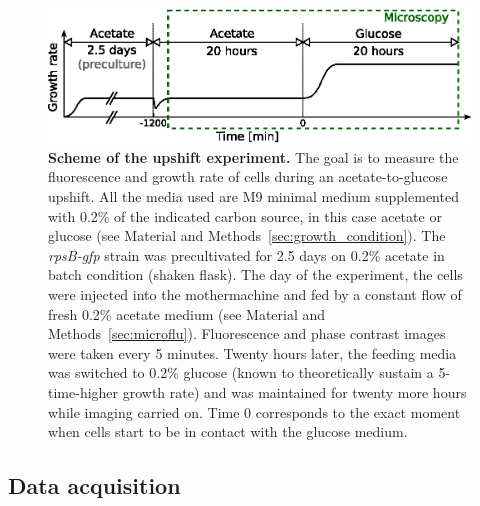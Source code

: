 \begin{figure}[tb]
\centering
\includegraphics[scale=1]{./Fig/experiment_schema.eps}
\caption{
\textbf{Scheme of the upshift experiment.}
The goal is to measure the fluorescence and growth rate of cells during an acetate-to-glucose upshift.
All the media used are M9 minimal medium supplemented with 0.2\% of the indicated carbon source, in this case acetate or glucose (see Material and Methods~\ref{sec:growth_condition}).
The \textit{rpsB-gfp} strain was precultivated for 2.5 days on 0.2\% acetate in batch condition (shaken flask).
The day of the experiment, the cells were injected into the mothermachine and fed by a constant flow of fresh 0.2\% acetate medium (see Material and Methods~\ref{sec:microflu}).
Fluorescence and phase contrast images were taken every 5 minutes.
Twenty hours later, the feeding media was switched to 0.2\% glucose (known to theoretically sustain a 5-time-higher growth rate) and was maintained for twenty more hours while imaging carried on.
Time 0 corresponds to the exact moment when cells start to be in contact with the glucose medium.
}
\label{fig:experiment_schema}
\end{figure}

\subsection{Data acquisition}

